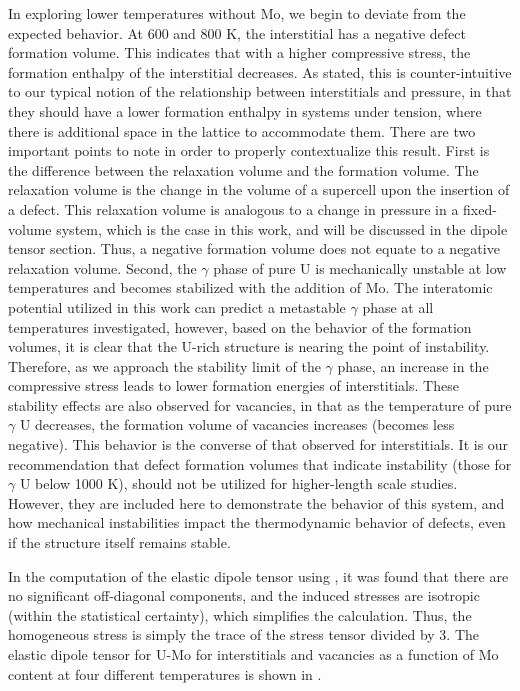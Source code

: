 \documentclass[review]{elsarticle}
\begin{document}
In exploring lower temperatures without Mo, we begin to deviate from the expected behavior. At 600 and 800 K, the interstitial has a negative defect formation volume. This indicates that with a higher compressive stress, the formation enthalpy of the interstitial decreases. As stated, this is counter-intuitive to our typical notion of the relationship between interstitials and pressure, in that they should have a lower formation enthalpy in systems under tension, where there is additional space in the lattice to accommodate them. There are two important points to note in order to properly contextualize this result. First is the difference between the relaxation volume and the formation volume. The relaxation volume is the change in the volume of a supercell upon the insertion of a defect. This relaxation volume is analogous to a change in pressure in a fixed-volume system, which is the case in this work, and will be discussed in the dipole tensor section. Thus, a negative formation volume does not equate to a negative relaxation volume. Second, the $\gamma$ phase of pure U is mechanically unstable at low temperatures \cite{beeler2010} and becomes stabilized with the addition of Mo. The interatomic potential utilized in this work can predict a metastable $\gamma$ phase at all temperatures investigated, however, based on the behavior of the formation volumes, it is clear that the U-rich structure is nearing the point of instability. Therefore, as we approach the stability limit of the $\gamma$ phase, an increase in the compressive stress leads to lower formation energies of interstitials. These stability effects are also observed for vacancies, in that as the temperature of pure $\gamma$ U decreases, the formation volume of vacancies increases (becomes less negative). This behavior is the converse of that observed for interstitials. It is our recommendation that defect formation volumes that indicate instability (those for $\gamma$ U below 1000 K), should not be utilized for higher-length scale studies. However, they are included here to demonstrate the behavior of this system, and how mechanical instabilities impact the thermodynamic behavior of defects, even if the structure itself remains stable. 

In the computation of the elastic dipole tensor using , it was found that there are no significant off-diagonal components, and the induced stresses are isotropic (within the statistical certainty), which simplifies the calculation. Thus, the homogeneous stress is simply the trace of the stress tensor divided by 3. The elastic dipole tensor for U-Mo for interstitials and vacancies as a function of Mo content at four different temperatures is shown in .
\end{document}
